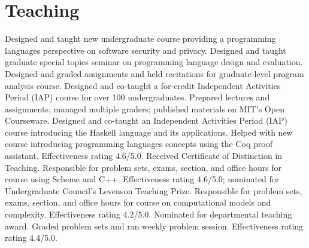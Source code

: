 \section{Teaching}
  {}{Designed and taught new undergraduate course providing a programming languages perspective on software security and privacy.}
  {}{Designed and taught graduate special topics seminar on programming language design and evaluation.}
  {}{Designed and graded assignments and held recitations for graduate-level program analysis course.}
  {}{Designed and co-taught a for-credit Independent Activities Period (IAP) course for over 100 undergraduates.  Prepared lectures and assignments; managed multiple graders; published materials on MIT's Open Courseware.}
  {}{Designed and co-taught an Independent Activities Period (IAP) course introducing the Haskell language and its applications.}
  {}{Helped with new course introducing programming languages concepts using the Coq proof assistant.  Effectiveness rating 4.6/5.0.  Received Certificate of Distinction in Teaching.}
  {Responsible for problem sets, exams, section, and office hours for course using Scheme and C++.  Effectiveness rating 4.6/5.0; nominated for Undergraduate Council's Levenson Teaching Prize.}
  {Responsible for problem sets, exams, section, and office hours for course on computational models and complexity.  Effectiveness rating 4.2/5.0.  Nominated for departmental teaching award.}
  {Graded problem sets and ran weekly problem session.  Effectiveness rating rating 4.4/5.0.}
